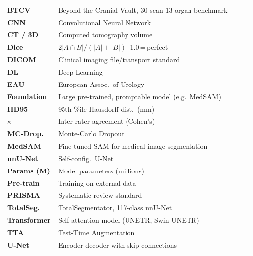 \documentclass[final,t]{beamer}
\begin{document}
\begin{frame}[t]
\begin{columns}[t,totalwidth=\textwidth]
\begin{column}{0.315\textwidth}
\begin{tcolorbox}[
  title={Glossary \& Abbreviations},
  colbacktitle=utadred,
  coltitle=white,
  colback=utadgray!22,
  colframe=utadnavy!85!black,
  fonttitle=\large\bfseries,
  boxrule=1.5pt,
  arc=5pt,
  lefttitle=7pt,
  toptitle=2pt,
  bottomtitle=2pt,
  top=4pt, bottom=4pt, left=6pt, right=6pt,
  before={\vskip2pt},
  after={\vskip2pt},
  enhanced,
  drop shadow={utadnavy!25!white,opacity=0.5},
]
\footnotesize
\setlength{\tabcolsep}{3pt}
\renewcommand{\arraystretch}{0.9}
\begin{tabular}{@{}p{0.2\linewidth}p{0.78\linewidth}@{}}
\textbf{BTCV}        & Beyond the Cranial Vault, 30-scan 13-organ benchmark\\
\textbf{CNN}         & Convolutional Neural Network \\
\textbf{CT / 3D}     & Computed tomography volume \\
\textbf{Dice}        & $2|A\cap B|/(|A|+|B|)$; 1.0\,=\,perfect \\
\textbf{DICOM}       & Clinical imaging file/transport standard \\
\textbf{DL}          & Deep Learning \\
\textbf{EAU}         & European Assoc.\ of Urology \\
\textbf{Foundation}  & Large pre-trained, promptable model (e.g.\ MedSAM) \\
\textbf{HD95}        & 95th-\%ile Hausdorff dist.\ (mm) \\
\textbf{$\kappa$}    & Inter-rater agreement (Cohen's) \\
\textbf{MC-Drop.}    & Monte-Carlo Dropout \\
\textbf{MedSAM}      & Fine-tuned SAM for medical image segmentation \\
\textbf{nnU-Net}     & Self-config.\ U-Net \\
\textbf{Params (M)}  & Model parameters (millions) \\
\textbf{Pre-train}   & Training on external data \\
\textbf{PRISMA}      & Systematic review standard \\
\textbf{TotalSeg.}   & TotalSegmentator, 117-class nnU-Net \\
\textbf{Transformer} & Self-attention model (UNETR, Swin UNETR) \\
\textbf{TTA}         & Test-Time Augmentation \\
\textbf{U-Net}       & Encoder-decoder with skip connections \\
\end{tabular}
\end{tcolorbox}


\end{column}
\end{columns}
\end{frame}
\end{document}
